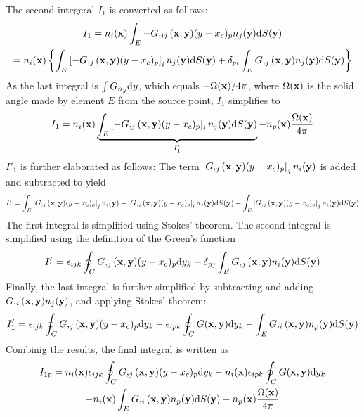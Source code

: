 The second integeral $I_1$ is converted as follows:
%
\begin{multline}
	I_1
	= n_i({\bf x}) \int_E -G,_{ij}({\bf x}, {\bf y}) 
	(y - x_c)_p
	n_j({\bf y})
	\mathrm{d} S({\bf y}) \\
	= n_i({\bf x})
	\left\{ \int_E \left[-G,_{j}({\bf x}, {\bf y}) 
	(y - x_c)_p\right]_i
	n_j({\bf y})
	\mathrm{d} S({\bf y})
	+
	\delta_{pi}
	\int_E G,_{j}({\bf x}, {\bf y}) 
	n_j({\bf y})
	\mathrm{d} S({\bf y})
	\right\}
\end{multline}
%
As the last integral is $\int G_{n_y} \mathrm{d} y$, which equals $-\Omega({\bf x})/4\pi$, where $\Omega({\bf x})$ is the solid angle made by element $E$ from the source point, $I_1$ simplifies to
%
\begin{equation}
	I_1
	= 
	n_i({\bf x})
	\underbrace{\int_E
	\left[-G,_{j}({\bf x}, {\bf y}) 
	(y - x_c)_p\right]_i
	n_j({\bf y})
	\mathrm{d} S({\bf y})}_{I'_1}
	-
	n_p({\bf x})
	\frac{\Omega({\bf x})}{4\pi}
\end{equation}
%
$I'_1$ is further elaborated as follows: The term $\left[G,_{j}({\bf x}, {\bf y}) (y - x_c)_p\right]_j n_i({\bf y})$ is added and subtracted to yield
%
\begin{equation}
	I'_1 = 
	\int_E
	\left[G,_{j}({\bf x}, {\bf y}) (y - x_c)_p\right]_j
	n_i({\bf y})
	-
	\left[G,_{j}({\bf x}, {\bf y}) (y - x_c)_p\right]_i
	n_j({\bf y})
	\mathrm{d} S({\bf y})
	-
	\int_E
	\left[G,_{j}({\bf x}, {\bf y}) (y - x_c)_p\right]_j
	n_i({\bf y})
	\mathrm{d} S({\bf y})
\end{equation}
%
The first integral is simplified using Stokes' theorem. The second integral is simplified using the definition of the Green's function
%
\begin{equation}
	I'_1 = 
	\epsilon_{ijk}
	\oint_C
	G,_{j}({\bf x}, {\bf y}) (y - x_c)_p
	\mathrm{d} y_k
	-
	\delta_{pj}
	\int_E
		G,_{j}({\bf x}, {\bf y})
		n_i({\bf y})
	\mathrm{d} S({\bf y})
\end{equation}
%
Finally, the last integral is further simplified by subtracting and adding $G,_{i}({\bf x}, {\bf y}) n_j({\bf y})$, and applying Stokes' theorem:
%
\begin{equation}
	I'_1 = 
	\epsilon_{ijk}
	\oint_C
	G,_{j}({\bf x}, {\bf y}) (y - x_c)_p
	\mathrm{d} y_k
	-
	\epsilon_{ipk}
	\oint_C
		G({\bf x}, {\bf y})
	\mathrm{d} y_k
	-
	\int_E
		G,_{i}({\bf x}, {\bf y}) n_p({\bf y})
	\mathrm{d} S({\bf y})
\end{equation}
%
Combinig the results, the final integral is written as
%
\begin{multline}
	I_{1p} = 
	n_i({\bf x})
	\epsilon_{ijk}
	\oint_C
	G,_{j}({\bf x}, {\bf y}) (y - x_c)_p
	\mathrm{d} y_k
	-
	n_i({\bf x})
	\epsilon_{ipk}
	\oint_C
		G({\bf x}, {\bf y})
	\mathrm{d} y_k \\
	-
	n_i({\bf x})
	\int_E
		G,_{i}({\bf x}, {\bf y}) n_p({\bf y})
	\mathrm{d} S({\bf y})
	-
	n_p({\bf x}) \frac{\Omega({\bf x})}{4\pi}
\end{multline}

